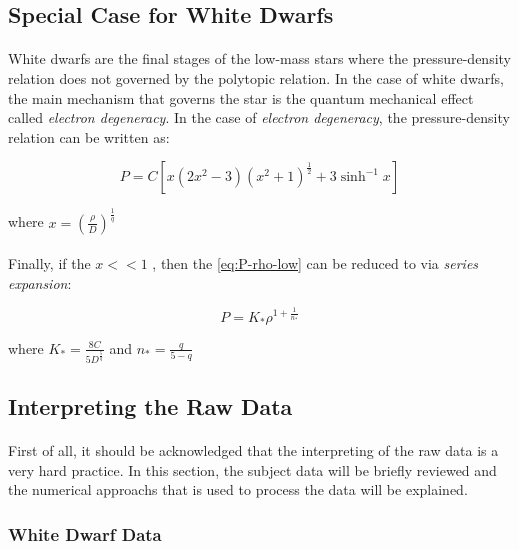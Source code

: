 \documentclass[letterpaper,12pt]{article}
\begin{document}
\subsection{Special Case for White Dwarfs}

\paragraph{} White dwarfs are the final stages of the low-mass stars where the pressure-density relation does not governed by the polytopic relation. In the case of white dwarfs, the main mechanism that governs the star is the quantum mechanical effect called \textit{electron degeneracy}. In the case of \textit{electron degeneracy}, the pressure-density relation can be written as:

\begin{equation}
    \label{eq:P-rho-low}
    P = C \left[x \left(2x^2-3\right)\left(x^2+1\right)^{\frac{1}{2}}+3\sinh^{-1}{x}\right]
\end{equation}

where $x = \left(\frac{\rho}{D}\right)^{\frac{1}{q}}$

\paragraph{} Finally, if the $x<<1$ , then the \eqref{eq:P-rho-low} can be reduced to via \textit{series expansion}:

\begin{equation}
    \label{eq:P-rho-low-reduced}
    P = K_* \rho^{1 + \frac{1}{n_*}}
\end{equation}

where $K_* = \frac{8C}{5D^{\frac{5}{q}}}$ and $n_* = \frac{q}{5-q}$

\subsection{Interpreting the Raw Data}
\paragraph{} First of all, it should be acknowledged that the interpreting of the raw data is a very hard practice. In this section, the subject data will be briefly reviewed and the numerical approachs that is used to process the data will be explained.

\subsubsection{White Dwarf Data}
\end{document}
